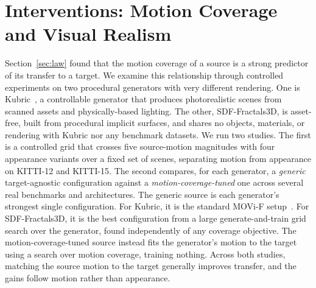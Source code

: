 \section{Interventions: Motion Coverage and Visual Realism}
\label{sec:interv}

Section~\ref{sec:law} found that the motion coverage of a source is a strong
predictor of its transfer to a target. We examine this relationship through
controlled experiments on two procedural generators with very different rendering.
One is Kubric~\cite{greff2021kubric}, a controllable generator that produces
photorealistic scenes from scanned assets and physically-based lighting. The other,
SDF-Fractals3D, is asset-free, built from procedural implicit surfaces, and shares
no objects, materials, or rendering with Kubric nor any benchmark datasets. We run two studies. The first is a
controlled grid that crosses five source-motion magnitudes with four appearance
variants over a fixed set of scenes, separating motion from appearance on KITTI-12 and KITTI-15. The
second compares, for each generator, a \emph{generic} target-agnostic configuration
against a \emph{motion-coverage-tuned} one across several real benchmarks and architectures.
The generic source is each generator's strongest single configuration. For Kubric, it
is the standard MOVi-F setup~\cite{greff2021kubric}. For SDF-Fractals3D, it is the best
configuration from a large generate-and-train grid search over the generator, found
independently of any coverage objective. The motion-coverage-tuned source instead
fits the generator's motion to the target using a search over motion coverage, training nothing. Across both studies, matching the source motion
to the target generally improves transfer, and the gains follow motion rather than
appearance.

